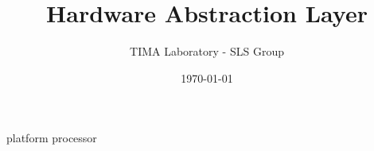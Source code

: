 \documentclass[a4paper,11pt]{report}
\title{\textbf {Hardware Abstraction Layer}}
\author {TIMA Laboratory - SLS Group}
\date{\today}
\begin{document}
\maketitle

\tableofcontents

 {platform}
 {processor}
\end{document}
